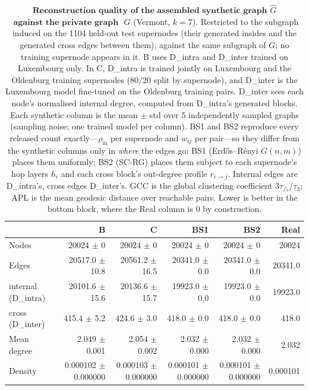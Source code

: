\begin{table}[H]
\centering
\caption{$\textbf{Reconstruction quality of the assembled synthetic graph}$
$\widehat{G}$ $\textbf{ against the private graph }$ $G$ (Vermont, $k{=}7$). Restricted to the subgraph induced on the 1104 held-out test supernodes (their generated insides and the generated cross edges between them), against the same subgraph of $G$; no training supernode appears in it.
B uses D\_intra and D\_inter trained on Luxembourg only. In C, D\_intra is trained jointly on Luxembourg and the Oldenburg training supernodes (80/20 split by supernode), and D\_inter is the Luxembourg model fine-tuned on the Oldenburg training pairs. D\_inter sees each node's normalised internal degree, computed from D\_intra's generated blocks. Each synthetic column is the
mean $\pm$ std over 5 independently sampled graphs (sampling noise; one trained
model per column). BS1 and BS2 reproduce every released count exactly---$\rho_{\mathrm{in}}$
per supernode and $w_{ij}$ per pair---so they differ from the synthetic columns
only in \emph{where} the edges go: BS1 (Erd\H{o}s--R\'enyi $G(n,m)$) places them
uniformly; BS2 (SC-RG) places them subject to each supernode's hop layers $h_i$ and
each cross block's out-degree profile $r_{i\to j}$. Internal edges are D\_intra's, cross edges
D\_inter's. GCC is the global clustering coefficient $3\tau_{\triangle}/\tau_{3}$;
APL is the mean geodesic distance over reachable pairs. Lower is better in the
bottom block, where the Real column is $0$ by construction.}
\label{tab:lsyn-vermont-k7-test}
\begin{tabular}{lrrrrr}
\toprule
 & B & C & BS1 & BS2 & Real \\
\midrule
Nodes                         & 20024 $\pm$ 0 & 20024 $\pm$ 0 & 20024 $\pm$ 0 & 20024 $\pm$ 0 & 20024 \\
Edges                         & 20517.0 $\pm$ 10.8 & 20561.2 $\pm$ 16.5 & 20341.0 $\pm$ 0.0 & 20341.0 $\pm$ 0.0 & 20341.0 \\
\quad internal (D\_intra)     & 20101.6 $\pm$ 15.6 & 20136.6 $\pm$ 15.7 & 19923.0 $\pm$ 0.0 & 19923.0 $\pm$ 0.0 & 19923.0 \\
\quad cross (D\_inter)        & 415.4 $\pm$ 5.2 & 424.6 $\pm$ 3.0 & 418.0 $\pm$ 0.0 & 418.0 $\pm$ 0.0 & 418.0 \\
Mean degree                   & 2.049 $\pm$ 0.001 & 2.054 $\pm$ 0.002 & 2.032 $\pm$ 0.000 & 2.032 $\pm$ 0.000 & 2.032 \\
Density                       & 0.000102 $\pm$ 0.000000 & 0.000103 $\pm$ 0.000000 & 0.000101 $\pm$ 0.000000 & 0.000101 $\pm$ 0.000000 & 0.000101 \\

\end{tabular}
\end{table}
